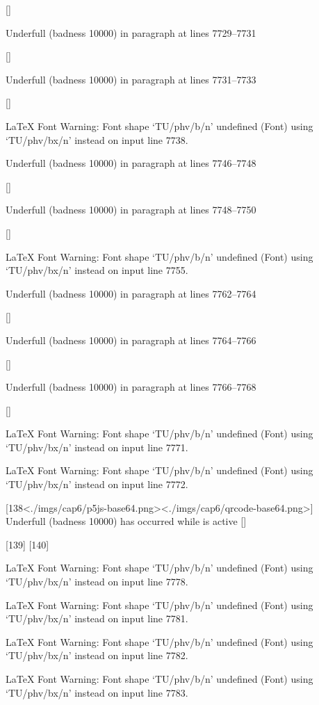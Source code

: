  []


Underfull \hbox (badness 10000) in paragraph at lines 7729--7731

 []


Underfull \hbox (badness 10000) in paragraph at lines 7731--7733

 []


LaTeX Font Warning: Font shape `TU/phv/b/n' undefined
(Font)              using `TU/phv/bx/n' instead on input line 7738.


Underfull \hbox (badness 10000) in paragraph at lines 7746--7748

 []


Underfull \hbox (badness 10000) in paragraph at lines 7748--7750

 []


LaTeX Font Warning: Font shape `TU/phv/b/n' undefined
(Font)              using `TU/phv/bx/n' instead on input line 7755.


Underfull \hbox (badness 10000) in paragraph at lines 7762--7764

 []


Underfull \hbox (badness 10000) in paragraph at lines 7764--7766

 []


Underfull \hbox (badness 10000) in paragraph at lines 7766--7768

 []


LaTeX Font Warning: Font shape `TU/phv/b/n' undefined
(Font)              using `TU/phv/bx/n' instead on input line 7771.


LaTeX Font Warning: Font shape `TU/phv/b/n' undefined
(Font)              using `TU/phv/bx/n' instead on input line 7772.

[138<./imgs/cap6/p5js-base64.png><./imgs/cap6/qrcode-base64.png>]
Underfull \vbox (badness 10000) has occurred while \output is active []

[139] [140]

LaTeX Font Warning: Font shape `TU/phv/b/n' undefined
(Font)              using `TU/phv/bx/n' instead on input line 7778.


LaTeX Font Warning: Font shape `TU/phv/b/n' undefined
(Font)              using `TU/phv/bx/n' instead on input line 7781.


LaTeX Font Warning: Font shape `TU/phv/b/n' undefined
(Font)              using `TU/phv/bx/n' instead on input line 7782.


LaTeX Font Warning: Font shape `TU/phv/b/n' undefined
(Font)              using `TU/phv/bx/n' instead on input line 7783.


